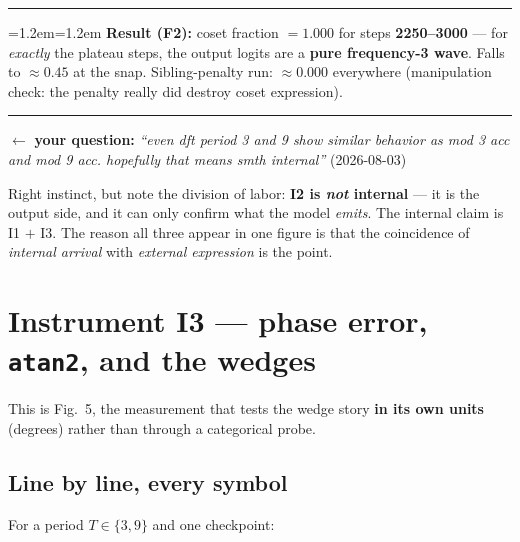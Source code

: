\documentclass[11pt]{article}
\newcommand{\yourq}[2]{%
  \par\vspace{4pt}\noindent
  \textcolor{qcol}{$\leftarrow$ \textbf{your question:}
  \textit{``#1''}\; \textnormal{(#2)}}\par\vspace{4pt}}
\newenvironment{keybox}
  {\par\vspace{7pt}\noindent\hrule\vspace{5pt}%
   \begingroup\leftskip=1.2em\rightskip=1.2em\noindent\ignorespaces}
  {\par\endgroup\vspace{5pt}\hrule\vspace{7pt}}
\begin{document}
\begin{keybox}
\textbf{Result (F2):} coset fraction $= \mathbf{1.000}$ for steps
\textbf{2250--3000} --- for \emph{exactly} the plateau steps, the output logits
are a \textbf{pure frequency-3 wave}. Falls to $\approx 0.45$ at the snap.
Sibling-penalty run: $\approx 0.000$ everywhere (manipulation check: the penalty
really did destroy coset expression).
\end{keybox}

\yourq{even dft period 3 and 9 show similar behavior as mod 3 acc and mod 9 acc.
hopefully that means smth internal}{2026-08-03}

\noindent Right instinct, but note the division of labor: \textbf{I2 is
\emph{not} internal} --- it is the output side, and it can only confirm what the
model \emph{emits}. The internal claim is I1 $+$ I3. The reason all three appear
in one figure is that the coincidence of \emph{internal arrival} with
\emph{external expression} is the point.

\section{Instrument I3 --- phase error, \texttt{atan2}, and the wedges}
\label{sec:atan2}

This is Fig.~5, the measurement that tests the wedge story \textbf{in its own
units} (degrees) rather than through a categorical probe.

\subsection*{Line by line, every symbol}

For a period $T \in \{3,9\}$ and one checkpoint:
\end{document}
